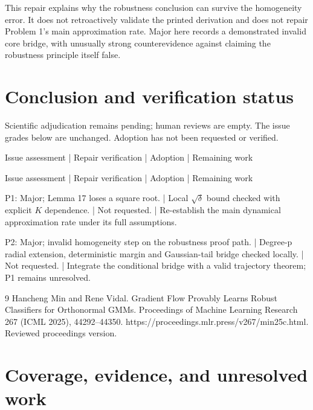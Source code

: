 \documentclass[10pt]{article}
\begin{document}
This repair explains why the robustness conclusion can survive the homogeneity error. It does not retroactively validate the printed derivation and does not repair Problem 1’s main approximation rate. Major here records a demonstrated invalid core bridge, with unusually strong counterevidence against claiming the robustness principle itself false.\par
\section*{Conclusion and verification status}
Scientific adjudication remains pending; human reviews are empty. The issue grades below are unchanged. Adoption has not been requested or verified.\par
Issue assessment | Repair verification | Adoption | Remaining work\par
Issue assessment | Repair verification | Adoption | Remaining work\par
P1: Major; Lemma 17 loses a square root. | Local \(\sqrt{\delta}\) bound checked with explicit \(K\) dependence. | Not requested. | Re-establish the main dynamical approximation rate under its full assumptions.\par
P2: Major; invalid homogeneity step on the robustness proof path. | Degree-p radial extension, deterministic margin and Gaussian-tail bridge checked locally. | Not requested. | Integrate the conditional bridge with a valid trajectory theorem; P1 remains unresolved.\par
9 Hancheng Min and Rene Vidal. Gradient Flow Provably Learns Robust Classifiers for Orthonormal GMMs. Proceedings of Machine Learning Research 267 (ICML 2025), 44292–44350. https://proceedings.mlr.press/v267/min25c.html. Reviewed proceedings version.\par
\section*{Coverage, evidence, and unresolved work}
\end{document}

